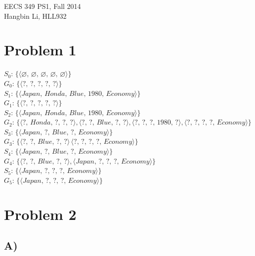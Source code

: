 \documentclass[11pt]{article}
\begin{document}
\begin{center}
EECS 349 PS1, Fall 2014 \\
Hangbin Li, HLL932
\end{center}

\section*{Problem 1}

$S_0$: $\{\langle \varnothing,\, \varnothing,\, \varnothing,\, \varnothing,\, \varnothing \rangle\}$ \\
$G_0$: $\{\langle ?,\, ?,\, ?,\, ?,\, ? \rangle\}$\\

\noindent $S_1$: $\{\langle Japan,\, Honda,\, Blue,\, 1980,\, Economy \rangle\}$ \\
\noindent $G_1$: $\{\langle ?,\, ?,\, ?,\, ?,\, ? \rangle\}$ \\

\noindent $S_2$: $\{\langle Japan,\, Honda,\, Blue,\, 1980,\, Economy \rangle\}$ \\
\noindent $G_2$: $\{\langle ?,\, Honda,\, ?,\, ?,\, ? \rangle, \langle ?,\, ?,\, Blue,\, ?,\, ? \rangle, \langle ?,\, ?,\, ?,\, 1980,\, ? \rangle, \langle ?,\, ?,\, ?,\, ?,\, Economy \rangle\}$ \\

\noindent $S_3$: $\{\langle Japan,\, ?,\, Blue,\, ?,\, Economy \rangle\}$ \\
\noindent $G_3$: $\{\langle ?,\, ?,\, Blue,\, ?,\, ? \rangle\, \langle ?,\, ?,\, ?,\, ?,\, Economy \rangle\}$ \\

\noindent $S_4$: $\{\langle Japan,\, ?,\, Blue,\, ?,\, Economy \rangle\}$ \\
\noindent $G_4$: $\{\langle ?,\, ?,\, Blue,\, ?,\, ? \rangle , \langle Japan,\, ?,\, ?,\, ?,\, Economy \rangle \}$ \\

\noindent $S_5$: $\{\langle Japan,\, ?,\, ?,\, ?,\, Economy \rangle\}$ \\
\noindent $G_5$: $\{\langle Japan,\, ?,\, ?,\, ?,\, Economy \rangle\}$ \\


\section*{Problem 2}

\subsection*{A)}
\end{document}
